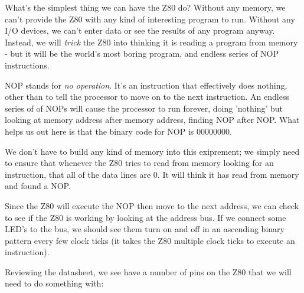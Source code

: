 \documentclass[10pt]{report}
\begin{document}
What's the simplest thing we can have the Z80 do? Without any memory, we can't provide the Z80 with any kind of interesting program to run. Without any I/O devices, we can't enter data or see the results of any program anyway. Instead, we will \textit{trick} the Z80 into thinking it is reading a program from memory - but it will be the world's most boring program, and endless series of NOP instructions.

NOP stands for \textit{no operation}. It's an instruction that effectively does nothing, other than to tell the processor to move on to the next instruction. An endless series of of NOPs will cause the processor to run forever, doing 'nothing' but looking at memory address after memory address, finding NOP after NOP. What helps us out here is that the binary code for NOP is 00000000.

We don't have to build any kind of memory into this exiprement; we simply need to ensure that whenever the Z80 tries to read from memory looking for an instruction, that all of the data lines are 0. It will think it has read from memory and found a NOP.

Since the Z80 will execute the NOP then move to the next address, we can check to see if the Z80 is working by looking at the address bus. If we connect some LED's to the bus, we should see them turn on and off in an ascending binary pattern every few clock ticks (it takes the Z80 multiple clock ticks to execute an instruction).

Reviewing the datasheet, we see have a number of pins on the Z80 that we will need to do something with:
\end{document}
